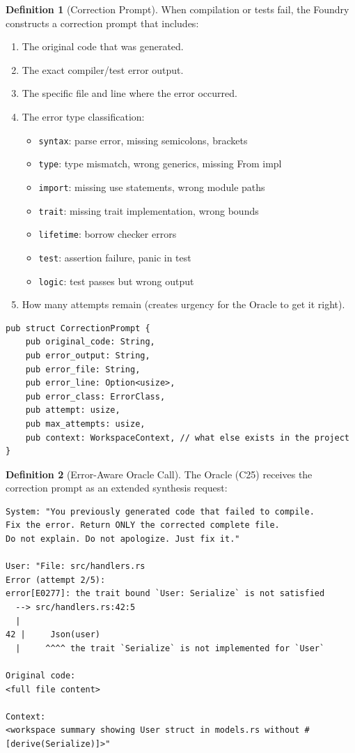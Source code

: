 \documentclass[11pt,a4paper,twoside]{article}
\theoremstyle{definition}
\newtheorem{definition}{Definition}[section]
\theoremstyle{plain}
\theoremstyle{remark}
\begin{document}
\begin{definition}[Correction Prompt]\label{def:correction}
When compilation or tests fail, the Foundry constructs a correction
prompt that includes:
\begin{enumerate}[nosep]
  \item The original code that was generated.
  \item The exact compiler/test error output.
  \item The specific file and line where the error occurred.
  \item The error type classification:
        \begin{itemize}[nosep]
          \item \texttt{syntax}: parse error, missing semicolons, brackets
          \item \texttt{type}: type mismatch, wrong generics, missing From impl
          \item \texttt{import}: missing use statements, wrong module paths
          \item \texttt{trait}: missing trait implementation, wrong bounds
          \item \texttt{lifetime}: borrow checker errors
          \item \texttt{test}: assertion failure, panic in test
          \item \texttt{logic}: test passes but wrong output
        \end{itemize}
  \item How many attempts remain (creates urgency for the Oracle to
        get it right).
\end{enumerate}
\begin{lstlisting}
pub struct CorrectionPrompt {
    pub original_code: String,
    pub error_output: String,
    pub error_file: String,
    pub error_line: Option<usize>,
    pub error_class: ErrorClass,
    pub attempt: usize,
    pub max_attempts: usize,
    pub context: WorkspaceContext, // what else exists in the project
}
\end{lstlisting}
\end{definition}

\begin{definition}[Error-Aware Oracle Call]\label{def:errorcall}
The Oracle (C25) receives the correction prompt as an extended
synthesis request:
\begin{lstlisting}
System: "You previously generated code that failed to compile.
Fix the error. Return ONLY the corrected complete file.
Do not explain. Do not apologize. Just fix it."

User: "File: src/handlers.rs
Error (attempt 2/5):
error[E0277]: the trait bound `User: Serialize` is not satisfied
  --> src/handlers.rs:42:5
  |
42 |     Json(user)
  |     ^^^^ the trait `Serialize` is not implemented for `User`

Original code:
<full file content>

Context:
<workspace summary showing User struct in models.rs without #[derive(Serialize)]>"
\end{lstlisting}
\end{definition}
\end{document}
